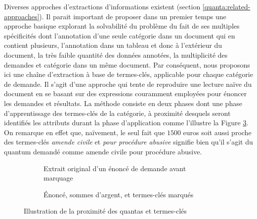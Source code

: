 Diverses approches d'extractions d'informations existent (section \ref{quanta:related-approaches}). Il parait important de proposer dans un premier temps une approche basique explorant la solvabilité du problème du fait de ses multiples spécificités dont l'annotation d'une seule catégorie dans un document qui en contient plusieurs, l'annotation dans un tableau et donc à l'extérieur du document, la très faible quantité des données annotées, la multiplicité des demandes et catégorie dans un même document. Par conséquent, nous proposons ici une chaîne d'extraction à base de termes-clés, applicable pour chaque catégorie de demande. Il s'agit d'une approche qui tente de reproduire une lecture naïve du document en se basant sur des expressions couramment employées pour énoncer les demandes et résultats. La méthode consiste en deux phases dont une phase d'apprentissage des termes-clés de la catégorie, à proximité desquels seront identifiés les attributs durant la phase d'application comme l'illustre la Figure \ref{fig:quanta:exemple-proximite}. On remarque en effet que, naïvement, le seul fait que $1500$ euros soit aussi proche des termes-clés \textit{amende civile} et \textit{pour procédure abusive} signifie bien qu'il s'agit du quantum demandé comme amende civile pour procédure abusive.

\begin{figure}[!htb]
	\scriptsize
	\centering
	\begin{subfigure}[t]{0.95\textwidth}
		\caption{Extrait original d'un énoncé de demande avant marquage}\label{fig:quanta:exemple-proximite-original}
	\end{subfigure} 
	
	
	\begin{subfigure}[t]{0.95\textwidth}
		\caption{Énoncé, sommes d'argent, et termes-clés marqués}\label{fig:quanta:exemple-proximite-marquage}
	\end{subfigure}
	\caption{Illustration de la proximité des quantas et termes-clés}
	\label{fig:quanta:exemple-proximite}
\end{figure} 

